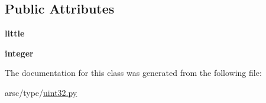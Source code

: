 \subsection*{Public Attributes}
\begin{DoxyCompactItemize}
\item 
\mbox{\label{classarsc_1_1type_1_1uint32_1_1uint32_a6a5b11f8db91ba698609ae52636bffc9}} 
{\bfseries little}
\item 
\mbox{\label{classarsc_1_1type_1_1uint32_1_1uint32_a6206b396a767e7ea5748f5b428a1662a}} 
{\bfseries integer}
\end{DoxyCompactItemize}


The documentation for this class was generated from the following file\+:\begin{DoxyCompactItemize}
\item 
arsc/type/\mbox{\hyperlink{uint32_8py}{uint32.\+py}}\end{DoxyCompactItemize}
